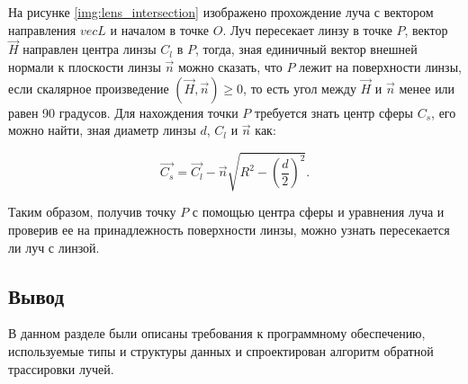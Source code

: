
На рисунке \ref{img:lens_intersection} изображено прохождение луча с вектором направления $vec{L}$ и началом в точке $O$. Луч пересекает линзу в точке $P$, вектор $\vec{H}$ направлен центра линзы $C_l$ в $P$, тогда, зная единичный вектор внешней нормали к плоскости линзы $\vec{n}$ можно сказать, что $P$ лежит на поверхности линзы, если скалярное произведение $(\vec{H}, \vec{n}) \geq 0$, то есть угол между $\vec{H}$ и $\vec{n}$ менее или равен 90 градусов. Для нахождения точки $P$ требуется знать центр сферы $C_s$, его можно найти, зная диаметр линзы $d$, $C_l$ и $\vec{n}$ как:

\begin{equation}
	\vec{C_s} = \vec{C_l} -  \vec{n}\sqrt{R^2 - \left(\frac{d}{2}\right)^2}.
\end{equation}

Таким образом, получив точку $P$ с помощью центра сферы и уравнения луча и проверив ее на принадлежность поверхности линзы, можно узнать пересекается ли луч с линзой.

\clearpage

\subsection*{Вывод}

В данном разделе были описаны требования к программному обеспечению, используемые типы и структуры данных и спроектирован алгоритм обратной трассировки лучей.

\clearpage

